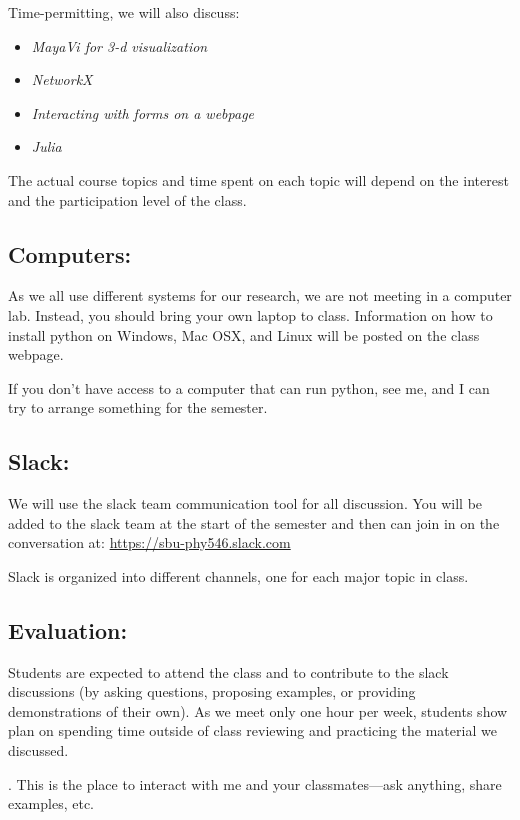 \documentclass[11pt]{article}
\newenvironment{itemsquish}
  { \begin{itemize}
    \addtolength{\itemsep}{-0.25\baselineskip}
    \addtolength{\baselineskip}{-0.25\baselineskip} }
  { \end{itemize} }
\begin{document}
\noindent Time-permitting, we will also discuss:
\begin{itemsquish}
\item {\em MayaVi for 3-d visualization}

\item {\em NetworkX}

\item {\em Interacting with forms on a webpage}

\item {\em Julia}
\end{itemsquish}

\noindent The actual course topics and time spent on each topic will depend on the
interest and the participation level of the class.


\subsection*{Computers:}
%
As we all use different systems for our research, we are not meeting
in a computer lab.  Instead, you should bring your own laptop to
class.  Information on how to install python on Windows, Mac OSX, and
Linux will be posted on the class webpage.

\noindent
If you don't have access to a computer that can run python, see me,
and I can try to arrange something for the semester.


\subsection*{Slack:}
%
We will use the slack team communication tool for all discussion.  You
will be added to the slack team at the start of the semester and then
can join in on the conversation at:
\url{https://sbu-phy546.slack.com}

Slack is organized into different channels, one for each major topic in class.


\subsection*{Evaluation:}


Students are expected to attend the class and to contribute
to the slack discussions (by asking questions, proposing examples, or
providing demonstrations of their own).  As we meet only one hour per
week, students show plan on spending time outside of class reviewing
and practicing the material we discussed.

.  This is the place to interact with
me and your classmates---ask anything, share examples, etc.
\end{document}
